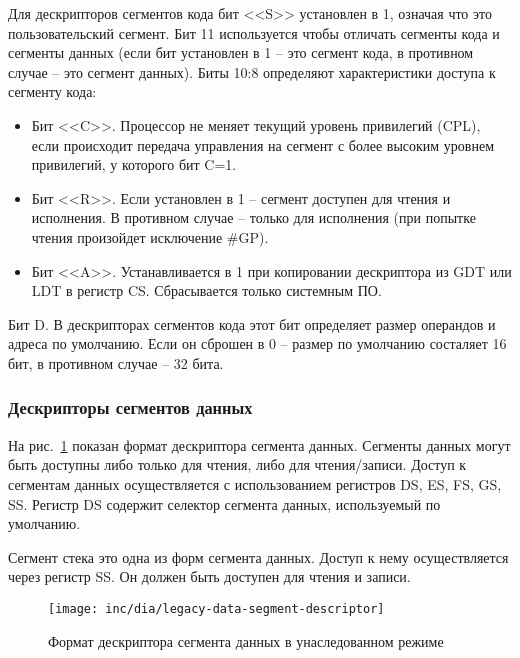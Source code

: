 Для дескрипторов сегментов кода бит <<S>> установлен в 1, означая что это пользовательский сегмент. Бит 11
используется чтобы отличать сегменты кода и сегменты данных (если бит установлен в 1 -- это сегмент кода,
в противном случае -- это сегмент данных). Биты 10:8 определяют характеристики доступа к сегменту кода:
\begin{itemize}
	\item Бит <<C>>. Процессор не меняет текущий уровень привилегий (CPL), если происходит передача управления
		на сегмент с более высоким уровнем привилегий, у которого бит C=1.
	\item Бит <<R>>. Если установлен в 1 -- сегмент доступен для чтения и исполнения. В противном случае --
		только для исполнения (при попытке чтения произойдет исключение \#GP).
	\item Бит <<A>>. Устанавливается в 1 при копировании дескриптора из GDT или LDT в регистр CS. Сбрасывается
		только системным ПО.
\end{itemize}

Бит D. В дескрипторах сегментов кода этот бит определяет размер операндов и адреса по умолчанию.
Если он сброшен в 0 -- размер по умолчанию состаляет 16 бит, в противном случае -- 32 бита.

\subsubsection*{Дескрипторы сегментов данных}
На рис.~\ref{fig:legacy-data-segment-descriptor-format} показан формат дескриптора сегмента данных.
Сегменты данных могут быть доступны либо только для чтения, либо для чтения/записи. Доступ к сегментам
данных осуществляется с использованием регистров DS, ES, FS, GS, SS. Регистр DS содержит селектор
сегмента данных, используемый по умолчанию.

Сегмент стека это одна из форм сегмента данных. Доступ к нему осуществляется через регистр SS. Он должен
быть доступен для чтения и записи.

\begin{figure}[ht!]
  \centering
  \texttt{[image: inc/dia/legacy-data-segment-descriptor]}
  \caption{Формат дескриптора сегмента данных в унаследованном режиме}
  \label{fig:legacy-data-segment-descriptor-format}
\end{figure}

